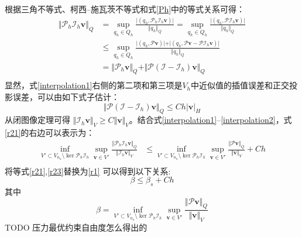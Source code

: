 根据三角不等式、柯西--施瓦茨不等式和式\eqref{Ph}中的等式关系可得：
\begin{equation}\label{interpolation1}
    \begin{split}
        \Vert \mathcal P_h \mathcal I_h \boldsymbol v \Vert_Q &= 
        \sup_{q_h \in Q_h} \frac{\vert (q_h, \mathcal P_h \mathcal I_h \boldsymbol v) \vert}{\Vert q_h \Vert_Q}
        =\sup_{q_h \in Q_h} \frac{\vert (q_h, \mathcal P \mathcal I_h \boldsymbol v) \vert}{\Vert q_h \Vert_Q} \\
        &\le \sup_{q_h \in Q_h} \frac{\vert (q_h, \mathcal P \boldsymbol v)\vert + \vert (q_h, \mathcal P \boldsymbol v - \mathcal P \mathcal I_h \boldsymbol v) \vert}{\Vert q_h \Vert_Q} \\
        &= \Vert \mathcal P_h \boldsymbol v \Vert_Q
        + \Vert \mathcal P(\mathcal I - \mathcal I_h) \boldsymbol v \Vert_Q \\
    \end{split}
\end{equation}
显然，式\eqref{interpolation1}右侧的第二项和第三项是$V_h$中近似值的插值误差和正交投影误差，可以由如下式子估计\cite{yosida1995}：
\begin{equation}\label{interpolation2}
        \Vert \mathcal P(\mathcal I - \mathcal I_h) \boldsymbol v \Vert_Q \le Ch \vert \boldsymbol v \vert_{H} 
\end{equation}
从闭图像定理\cite{quarteroni1994}可得 $\Vert \mathcal I_h \boldsymbol v\Vert_V \ge C\Vert \boldsymbol v \Vert_V$。结合式\eqref{interpolation1}--\eqref{interpolation2}，式\eqref{r21}的右边可以表示为：
\begin{equation}\label{r23}
    \begin{split}
        \inf_{V'\subset V_{n_u}\setminus \ker \mathcal P_h \mathcal I_h} \sup_{\boldsymbol v \in V'} \frac{\Vert \mathcal P_h\mathcal I_h\boldsymbol v\Vert_Q}{\Vert \mathcal I_h \boldsymbol v\Vert_V} 
        &\le \inf_{V'\subset V_{n_u}\setminus \ker \mathcal P_h \mathcal I_h} \sup_{\boldsymbol v \in V'} \frac{\Vert \mathcal P \boldsymbol v\Vert_Q}{\Vert \boldsymbol v\Vert_V} + Ch \\
    \end{split}
\end{equation}
将等式\eqref{r21},\eqref{r23}替换为\eqref{r1} 可以得到以下关系:
\begin{equation}\label{r3}
    \beta \le \beta_s + Ch
\end{equation}
其中
\begin{equation}
    \beta = \inf_{V'\subset V_{n_u}\setminus\ker \mathcal P_h \mathcal I_h}\sup_{\boldsymbol v \in V'}\frac{\Vert \mathcal P \boldsymbol v\Vert_Q}{\Vert  \boldsymbol v\Vert_V} 
\end{equation}
TODO 压力最优约束自由度怎么得出的

